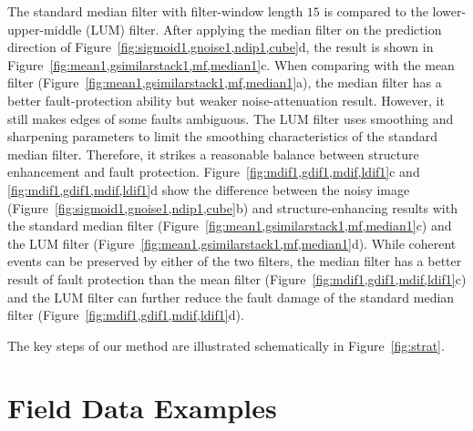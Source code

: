 The standard median filter with filter-window length $15$ is compared
to the lower-upper-middle (LUM) filter. After applying
the median filter on the prediction direction of
Figure~\ref{fig:sigmoid1,gnoise1,ndip1,cube}d, the result is shown in
Figure~\ref{fig:mean1,gsimilarstack1,mf,median1}c. When comparing with
the mean filter (Figure~\ref{fig:mean1,gsimilarstack1,mf,median1}a),
the median filter has a better fault-protection ability but weaker
noise-attenuation result. However, it still makes edges of some faults
ambiguous. The LUM filter uses smoothing and sharpening parameters to
limit the smoothing characteristics of the standard median
filter. Therefore, it strikes a reasonable balance between structure
enhancement and fault
protection. Figure~\ref{fig:mdif1,gdif1,mdif,ldif1}c and
\ref{fig:mdif1,gdif1,mdif,ldif1}d show the difference between the
noisy image (Figure~\ref{fig:sigmoid1,gnoise1,ndip1,cube}b) and
structure-enhancing results with the standard median filter
(Figure~\ref{fig:mean1,gsimilarstack1,mf,median1}c) and the LUM filter
(Figure~\ref{fig:mean1,gsimilarstack1,mf,median1}d). While coherent
events can be preserved by either of the two filters, the median
filter has a better result of fault protection than the mean filter
(Figure~\ref{fig:mdif1,gdif1,mdif,ldif1}c) and the LUM filter can
further reduce the fault damage of the standard median filter
(Figure~\ref{fig:mdif1,gdif1,mdif,ldif1}d).


The key steps of our method are illustrated schematically in Figure~\ref{fig:strat}.

 \section{Field Data Examples}

